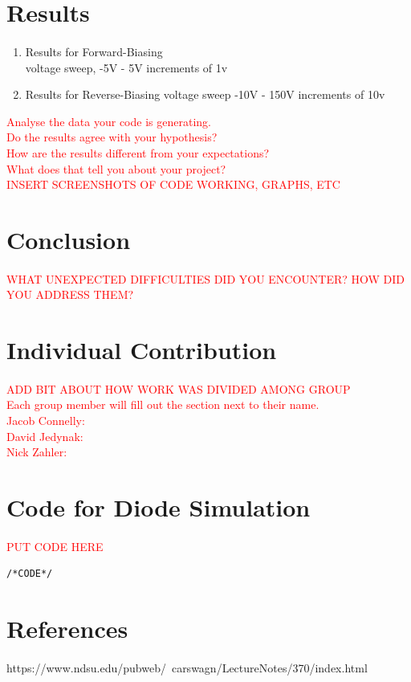 \documentclass[a4paper]{article}
\begin{document}
\section{Results}
\paragraph{}
\begin{enumerate}
\item Results for Forward-Biasing\\
voltage sweep, -5V - 5V
increments of 1v
\item Results for Reverse-Biasing
voltage sweep -10V - 150V
increments of 10v
\end{enumerate}
 \textcolor{red}{Analyse the data your code is generating. 
    \\Do the results agree with your hypothesis? \\
    How are the results different from your expectations?\\
    What does that tell you about your project?}\\
\textcolor{red}{INSERT SCREENSHOTS OF CODE WORKING, GRAPHS, ETC}



\section{Conclusion}
\paragraph{}
\textcolor{red}{WHAT UNEXPECTED DIFFICULTIES DID YOU ENCOUNTER? HOW DID YOU ADDRESS THEM?}

\section{Individual Contribution}
\paragraph{}
 \textcolor{red}{ADD BIT ABOUT HOW WORK WAS DIVIDED AMONG GROUP}\\
 \textcolor{red}{Each group member will fill out the section next to their name.\\
Jacob Connelly:\\
David Jedynak:\\
Nick Zahler:\\}

\section{Code for Diode Simulation}
\paragraph{}
\textcolor{red}{PUT CODE HERE}
\begin{lstlisting}
/*CODE*/

\end{lstlisting}
\section{References}
\paragraph{}
https://www.ndsu.edu/pubweb/~carswagn/LectureNotes/370/index.html
\end{document}
